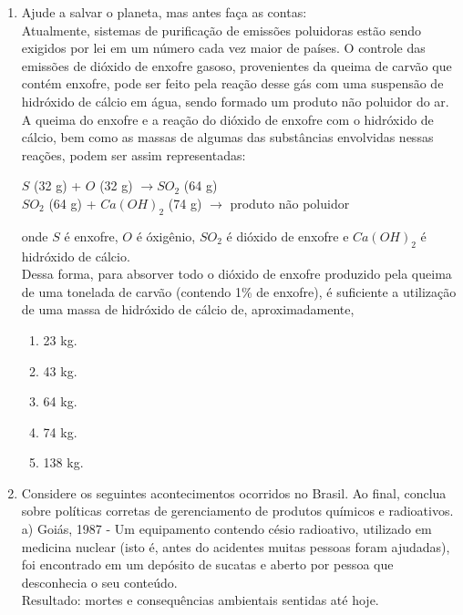 \documentclass[10pt,a4paper]{article}
\begin{document}
\begin{multicols}{2}
\begin{enumerate}

	\item Ajude a salvar o planeta, mas antes fa\c{c}a as contas:\\
	Atualmente, sistemas de purifica\c{c}\~ao de emissões poluidoras est\~ao sendo exigidos por lei em um n\'umero cada vez maior de pa\'ises. O controle das emissões de di\'oxido de enxofre gasoso, provenientes da queima de carv\~ao que cont\'em enxofre, pode ser feito pela rea\c{c}\~ao desse g\'as com uma suspens\~ao de hidr\'oxido de c\'alcio em \'agua, sendo formado um produto n\~ao poluidor do ar. \\
	A queima do enxofre e a rea\c{c}\~ao do di\'oxido de enxofre com o hidr\'oxido de c\'alcio, bem como as massas de algumas das substâncias envolvidas nessas rea\c{c}ões, podem ser assim representadas: \\
	\begin{center}
		$S$ (32 g) + $O$ (32 g) $\rightarrow SO_2$  (64 g) \\
		$SO_2$ (64 g) + $Ca(OH)_2$  (74 g) $\rightarrow$ produto n\~ao poluidor
	\end{center}
   onde $S$ \'e enxofre, $O$ \'e \'oxigênio, $SO_2$ \'e di\'oxido de enxofre e $Ca(OH)_2$ \'e hidr\'oxido de c\'alcio.\\
	Dessa forma, para absorver todo o di\'oxido de enxofre produzido pela queima de uma tonelada de carv\~ao (contendo 1\% de enxofre), \'e suficiente a utiliza\c{c}\~ao de uma massa de hidr\'oxido de c\'alcio de, aproximadamente, 
	\begin{enumerate}
	\item 23 kg.
	\item 43 kg.
	\item 64 kg.
	\item 74 kg.
	\item 138 kg.
	\end{enumerate}

	\item Considere os seguintes acontecimentos ocorridos no Brasil. Ao final, conclua sobre pol\'iticas corretas de gerenciamento de produtos qu\'imicos e radioativos.\\

a) Goi\'as, 1987 - Um equipamento contendo c\'esio radioativo, utilizado em medicina nuclear (isto \'e, antes do acidentes muitas pessoas foram ajudadas), foi encontrado em um dep\'osito de sucatas e aberto por pessoa que desconhecia o seu conte\'udo. \\
Resultado: mortes e consequências ambientais sentidas at\'e hoje. \\


\end{enumerate}
\end{multicols}
\end{document}
